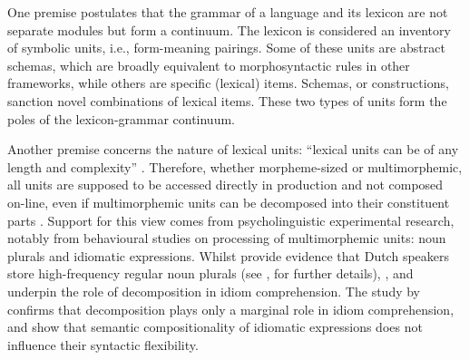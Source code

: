 One premise postulates that the grammar of a language and its lexicon are not separate modules but form a continuum. The lexicon is considered an inventory of symbolic units, i.e., form-meaning pairings. Some of these units are abstract schemas, which are broadly equivalent to morphosyntactic rules in other frameworks, while others are specific (lexical) items. Schemas, or constructions, sanction novel combinations of lexical items. These two types of units form the poles of the lexicon-grammar continuum.

Another premise concerns the nature of lexical units: ``lexical units can be of any length and complexity'' \citep[84]{backus-units-2003}. Therefore, whether morpheme-sized or multimorphemic, all units are supposed to be accessed directly in production and not composed on-line, even if multimorphemic units can be decomposed into their constituent parts \citep[cf.][129]{backus-two-1996}. Support for this view comes from psycholinguistic experimental research, notably from behavioural studies on processing of multimorphemic units: noun plurals and idiomatic expressions. Whilst \citet{baayen-dijkstra-schreuder} provide evidence that Dutch speakers store high-frequency regular noun plurals (see , for further details), \citet{libben-multidetermined-2008}, and \citet{tabossi-processing-2008} underpin the role of decomposition in idiom comprehension. The study by \citet{libben-multidetermined-2008} confirms that decomposition plays only a marginal role in idiom comprehension, and \citet{tabossi-processing-2008} show that semantic compositionality of idiomatic expressions does not influence their syntactic flexibility. 

